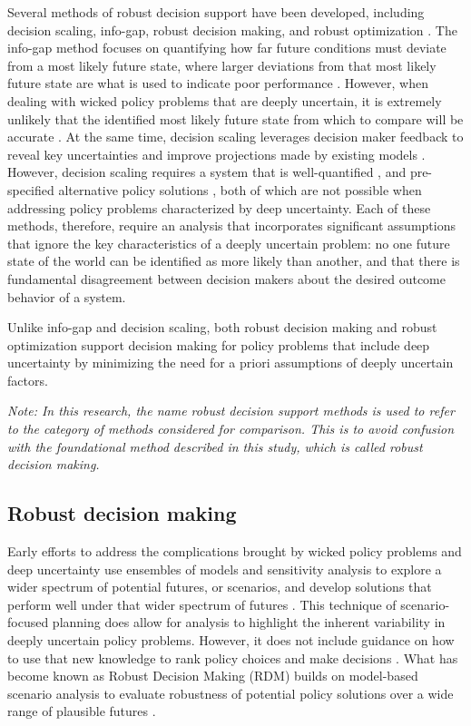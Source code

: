 Several methods of robust decision support have been developed, including decision scaling, info-gap, robust decision making, and robust optimization \citep{Herman2015}. The info-gap method focuses on quantifying how far future conditions must deviate from a most likely future state, where larger deviations from that most likely future state are what is used to indicate poor performance \citep{BenHaim2006}. However, when dealing with wicked policy problems that are deeply uncertain, it is extremely unlikely that the identified most likely future state from which to compare will be accurate \citep{Maier2016}. At the same time, decision scaling leverages decision maker feedback to reveal key uncertainties and improve projections made by existing models \citep{Brown2012}. However, decision scaling requires a system that is well-quantified \citep{Brown2012}, and pre-specified alternative policy solutions \citep{Herman2015}, both of which are not possible when addressing policy problems characterized by deep uncertainty. Each of these methods, therefore, require an analysis that incorporates significant assumptions that ignore the key characteristics of a deeply uncertain problem: no one future state of the world can be identified as more likely than another, and that there is fundamental disagreement between decision makers about the desired outcome behavior of a system.

Unlike info-gap and decision scaling, both robust decision making and robust optimization support decision making for policy problems that include deep uncertainty by minimizing the need for a priori assumptions of deeply uncertain factors.

\textit{Note: In this research, the name robust decision support methods is used to refer to the category of methods considered for comparison. This is to avoid confusion with the foundational method described in this study, which is called robust decision making.}

    \subsection{Robust decision making}
    Early efforts to address the complications brought by wicked policy problems and deep uncertainty use ensembles of models and sensitivity analysis to explore a wider spectrum of potential futures, or scenarios, and develop solutions that perform well under that wider spectrum of futures \citep{Bankes1993}. This technique of scenario-focused planning does allow for analysis to highlight the inherent variability in deeply uncertain policy problems. However, it does not include guidance on how to use that new knowledge to rank policy choices and make decisions \citep{Lempert2002}. What has become known as Robust Decision Making (RDM) builds on model-based scenario analysis to evaluate robustness of potential policy solutions over a wide range of plausible futures \citep{Lempert2002}. 
    
